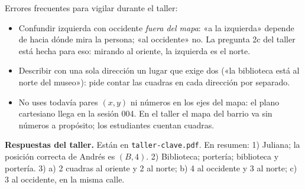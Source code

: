 \documentclass[11pt]{article}
\begin{document}
\begin{nota}
Errores frecuentes para vigilar durante el taller:
\begin{itemize}
  \item Confundir izquierda con occidente \emph{fuera del mapa}: «a la izquierda» depende de
        hacia dónde mira la persona; «al occidente» no. La pregunta 2c del taller está hecha
        para eso: mirando al oriente, la izquierda es el norte.
  \item Describir con una sola dirección un lugar que exige dos («la biblioteca está al
        norte del museo»): pide contar las cuadras en cada dirección por separado.
  \item No uses todavía pares $(x, y)$ ni números en los ejes del mapa: el plano cartesiano
        llega en la sesión 004. En el taller el mapa del barrio va sin números a propósito;
        los estudiantes cuentan cuadras.
\end{itemize}
\end{nota}

\textbf{Respuestas del taller.} Están en \texttt{taller-clave.pdf}. En resumen: 1) Juliana; la
posición correcta de Andrés es $(B, 4)$. 2) Biblioteca; portería; biblioteca y portería.
3) a) 2 cuadras al oriente y 2 al norte; b) 4 al occidente y 3 al norte; c) 3 al occidente,
en la misma calle.
\end{document}
